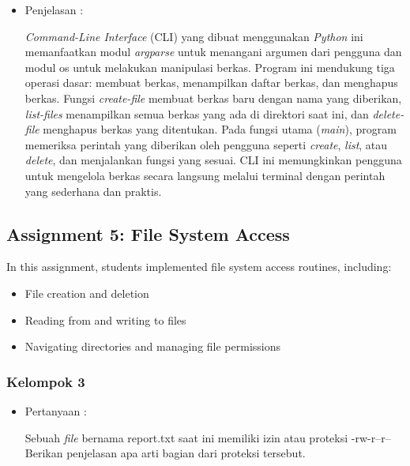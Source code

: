 \documentclass[12pt]{article}
\begin{document}
\begin{itemize}
    \item Penjelasan :

    \textit{Command-Line Interface} (CLI) yang dibuat menggunakan \textit{Python} ini memanfaatkan modul \textit{argparse} untuk menangani argumen dari pengguna dan modul os untuk melakukan manipulasi berkas. Program ini mendukung tiga operasi dasar: membuat berkas, menampilkan daftar berkas, dan menghapus berkas. Fungsi \textit{create-file} membuat berkas baru dengan nama yang diberikan, \textit{list-files} menampilkan semua berkas yang ada di direktori saat ini, dan \textit{delete-file} menghapus berkas yang ditentukan. Pada fungsi utama (\textit{main}), program memeriksa perintah yang diberikan oleh pengguna seperti \textit{create}, \textit{list}, atau \textit{delete}, dan menjalankan fungsi yang sesuai. CLI ini memungkinkan pengguna untuk mengelola berkas secara langsung melalui terminal dengan perintah yang sederhana dan praktis.
    
\end{itemize}

\subsection{Assignment 5: File System Access}
In this assignment, students implemented file system access routines, including:
\begin{itemize}
    \item File creation and deletion
    \item Reading from and writing to files
    \item Navigating directories and managing file permissions
\end{itemize}
\subsubsection{Kelompok 3}

\begin{itemize}
    \item  Pertanyaan :
    
    Sebuah \textit{file} bernama report.txt saat ini memiliki izin atau proteksi -rw-r--r-- Berikan penjelasan apa arti bagian dari proteksi tersebut.
\end{itemize}
\end{document}
